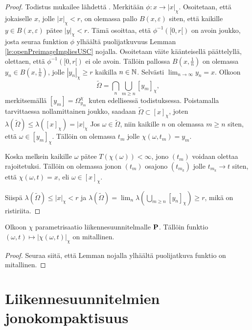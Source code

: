\documentclass[12pt,oneside,a4paper]{amsbook} %
\begin{document}
\begin{proof}
    Todistus mukailee lähdettä \cite[s. 32]{optimal}. Merkitään $\phi: x \to |x|_\chi$. Osoitetaan, että jokaiselle $x$, jolle $|x|_\chi < r$, on olemassa pallo $B(x, \varepsilon)$ siten, että kaikille $y \in B(x, \varepsilon)$ pätee $|y|_\chi < r$. Tämä osoittaa, että $\phi^{-1}([0, r[)$ on avoin joukko, josta seuraa funktion $\phi$ ylhäältä puolijatkuvuus Lemman \ref{le:openPreimageImpliesUSC} nojalla. Osoitetaan väite käänteisellä päättelyllä, olettaen, että $\phi^{-1}([0, r[)$ ei ole avoin. Tällöin pallossa $B(x, \frac{1}{n})$ on olemassa $y_n \in B(x, \frac{1}{n})$, jolle $|y_n|_\chi \ge r$ kaikilla $n\in \N$. Selvästi $\lim_{n\to\infty} y_n = x$. Olkoon
    \begin{equation*}
        \tilde{\Omega} = \bigcap_n \bigcup_{m \ge n} [y_m]_\chi,
    \end{equation*}
    merkitsemällä $[y_m] = \Omega_{y_m}^\chi$ kuten edellisessä todistuksessa. Poistamalla tarvittaessa nollamittainen joukko, saadaan $\tilde{\Omega} \subset [x]_\chi$, joten $\lambda(\tilde{\Omega}) \le \lambda([x]_\chi) = |x|_\chi$ Jos $\omega \in \tilde{\Omega}$, niin kaikille $n$ on olemassa $m \ge n$ siten, että $\omega \in [y_m]_\chi$. Tällöin on olemassa $t_m$ jolle $\chi(\omega, t_m) = y_m$. 
    
    Koska melkein kaikille $\omega$ pätee $T(\chi(\omega)) < \infty$, jono $(t_m)$ voidaan olettaa rajoitetuksi. Tällöin on olemassa jonon $(t_m)$ osajono $(t_{m_k})$ jolle $t_{m_k} \to t$ siten, että $\chi(\omega, t) = x$, eli $\omega \in [x]_\chi$. 
    
    Siispä $\lambda(\tilde{\Omega}) \le |x|_\chi < r$ ja $\lambda(\tilde{\Omega}) = \lim_n \lambda(\bigcup_{m \ge n} [y_n]_\chi) \ge r$, mikä on ristiriita.
\end{proof}

\begin{corollary}
    Olkoon $\chi$ parametrisaatio
    liikennesuunnitelmalle $\P$. Tällöin funktio $(\omega, t) \mapsto |\chi(\omega, t)|_\chi$ on mitallinen.
\end{corollary}
\begin{proof}
    Seuraa siitä, että Lemman  nojalla ylhäältä puolijatkuva funktio on mitallinen.
\end{proof}

\section{Liikennesuunnitelmien jonokompaktisuus}
\end{document}
